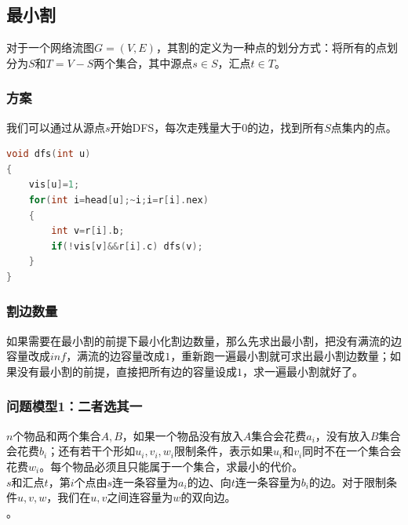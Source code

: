 \documentclass[a4paper]{book}
\begin{document}
\subsection{最小割}
对于一个网络流图$G=(V,E)$，其割的定义为一种点的划分方式：将所有的点划分为$S$和$T=V-S$两个集合，其中源点$s\in S$，汇点$t \in T$。
\subsubsection{方案}
我们可以通过从源点$s$开始DFS，每次走残量大于$0$的边，找到所有$S$点集内的点。
\begin{lstlisting}[language=c++]
void dfs(int u)
{
    vis[u]=1;
    for(int i=head[u];~i;i=r[i].nex)
    {
        int v=r[i].b;
        if(!vis[v]&&r[i].c) dfs(v);
    }
}
\end{lstlisting}
\subsubsection{割边数量}
如果需要在最小割的前提下最小化割边数量，那么先求出最小割，把没有满流的边容量改成$inf$，满流的边容量改成$1$，重新跑一遍最小割就可求出最小割边数量；如果没有最小割的前提，直接把所有边的容量设成$1$，求一遍最小割就好了。
\subsubsection{问题模型1：二者选其一}
$n$个物品和两个集合$A,B$，如果一个物品没有放入$A$集合会花费$a_i$，没有放入$B$集合会花费$b_i$；还有若干个形如$u_i,v_i,w_i$限制条件，表示如果$u_i$和$v_i$同时不在一个集合会花费$w_i$。每个物品必须且只能属于一个集合，求最小的代价。\\
$s$和汇点$t$，第$i$个点由$s$连一条容量为$a_i$的边、向$t$连一条容量为$b_i$的边。对于限制条件$u,v,w$，我们在$u,v$之间连容量为$w$的双向边。\\
。
\end{document}
